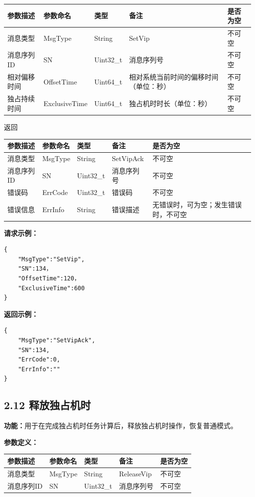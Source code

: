 \documentclass{ctexart}
\begin{document}
\begin{longtable}{|l|l|l|l|l|}
\hline
\textbf{\textbf{参数描述}} & \textbf{\textbf{参数命名}} & \textbf{\textbf{类型}} & \textbf{\textbf{备注}} & \textbf{\textbf{是否为空}} \\
\hline
消息类型 & MsgType & String & SetVip & 不可空 \\
消息序列ID & SN & Uint32_t & 消息序列号 & 不可空 \\
相对偏移时间 & OffsetTime & Uint64_t & 相对系统当前时间的偏移时间（单位：秒） & 不可空 \\
独占持续时间 & ExclusiveTime & Uint64_t & 独占机时时长（单位：秒） & 不可空 \\
\hline
\end{longtable}

返回

\begin{longtable}{|l|l|l|l|l|}
\hline
\textbf{\textbf{参数描述}} & \textbf{\textbf{参数命名}} & \textbf{\textbf{类型}} & \textbf{\textbf{备注}} & \textbf{\textbf{是否为空}} \\
\hline
消息类型 & MsgType & String & SetVipAck & 不可空 \\
消息序列ID & SN & Uint32_t & 消息序列号 & 不可空 \\
错误码 & ErrCode & Uint32_t & 错误码 & 不可空 \\
错误信息 & ErrInfo & String & 错误描述 & 无错误时，可为空；发生错误时，不可空 \\
\hline
\end{longtable}

\textbf{请求示例：}

\begin{verbatim}{
    "MsgType":"SetVip",
    "SN":134，
    "OffsetTime":120，
    "ExclusiveTime":600
}\end{verbatim}
\textbf{返回示例：}
\begin{verbatim}{
    "MsgType":"SetVipAck",
    "SN":134,
    "ErrCode":0,
    "ErrInfo":""
}\end{verbatim}

\subsection{2.12 释放独占机时}

\textbf{功能：}用于在完成独占机时任务计算后，释放独占机时操作，恢复普通模式。

\textbf{参数定义：}

\begin{longtable}{|l|l|l|l|l|}
\hline
\textbf{\textbf{参数描述}} & \textbf{\textbf{参数命名}} & \textbf{\textbf{类型}} & \textbf{\textbf{备注}} & \textbf{\textbf{是否为空}} \\
\hline
消息类型 & MsgType & String & ReleaseVip & 不可空 \\
消息序列ID & SN & Uint32_t & 消息序列号 & 不可空 \\
\hline
\end{longtable}
\end{document}
